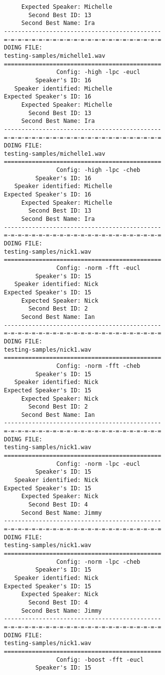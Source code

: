 \begin{verbatim}
     Expected Speaker: Michelle
       Second Best ID: 13
     Second Best Name: Ira
---------------------------------------------
=-=-=-=-=-=-=-=-=-=-=-=-=-=-=-=-=-=-=-=-=-=-=
DOING FILE:
testing-samples/michelle1.wav
=============================================
               Config: -high -lpc -eucl
         Speaker's ID: 16
   Speaker identified: Michelle
Expected Speaker's ID: 16
     Expected Speaker: Michelle
       Second Best ID: 13
     Second Best Name: Ira
---------------------------------------------
=-=-=-=-=-=-=-=-=-=-=-=-=-=-=-=-=-=-=-=-=-=-=
DOING FILE:
testing-samples/michelle1.wav
=============================================
               Config: -high -lpc -cheb
         Speaker's ID: 16
   Speaker identified: Michelle
Expected Speaker's ID: 16
     Expected Speaker: Michelle
       Second Best ID: 13
     Second Best Name: Ira
---------------------------------------------
=-=-=-=-=-=-=-=-=-=-=-=-=-=-=-=-=-=-=-=-=-=-=
DOING FILE:
testing-samples/nick1.wav
=============================================
               Config: -norm -fft -eucl
         Speaker's ID: 15
   Speaker identified: Nick
Expected Speaker's ID: 15
     Expected Speaker: Nick
       Second Best ID: 2
     Second Best Name: Ian
---------------------------------------------
=-=-=-=-=-=-=-=-=-=-=-=-=-=-=-=-=-=-=-=-=-=-=
DOING FILE:
testing-samples/nick1.wav
=============================================
               Config: -norm -fft -cheb
         Speaker's ID: 15
   Speaker identified: Nick
Expected Speaker's ID: 15
     Expected Speaker: Nick
       Second Best ID: 2
     Second Best Name: Ian
---------------------------------------------
=-=-=-=-=-=-=-=-=-=-=-=-=-=-=-=-=-=-=-=-=-=-=
DOING FILE:
testing-samples/nick1.wav
=============================================
               Config: -norm -lpc -eucl
         Speaker's ID: 15
   Speaker identified: Nick
Expected Speaker's ID: 15
     Expected Speaker: Nick
       Second Best ID: 4
     Second Best Name: Jimmy
---------------------------------------------
=-=-=-=-=-=-=-=-=-=-=-=-=-=-=-=-=-=-=-=-=-=-=
DOING FILE:
testing-samples/nick1.wav
=============================================
               Config: -norm -lpc -cheb
         Speaker's ID: 15
   Speaker identified: Nick
Expected Speaker's ID: 15
     Expected Speaker: Nick
       Second Best ID: 4
     Second Best Name: Jimmy
---------------------------------------------
=-=-=-=-=-=-=-=-=-=-=-=-=-=-=-=-=-=-=-=-=-=-=
DOING FILE:
testing-samples/nick1.wav
=============================================
               Config: -boost -fft -eucl
         Speaker's ID: 15

\end{verbatim}
